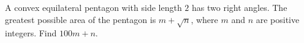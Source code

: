 A convex equilateral pentagon with side length $2$ has two right angles. The greatest possible area of the pentagon is $m+\sqrt{n}$, where $m$ and $n$ are positive integers. Find $100m+n$.
